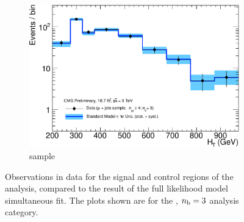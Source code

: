 \begin{figure}[h!]
\begin{subfigure}[b]{0.48\textwidth}
    \includegraphics[width=\textwidth]
    {Figs/results/v0/blueBand/single_plots/muon_3b_ge4j_logy.pdf}
    \caption{\mj sample}
  \end{subfigure}
  \caption{Observations in data for the signal and control
  regions of the analysis, compared to the result of the full likelihood model
  simultaneous fit. The plots shown are for the \njhigh, $n_{\text{b}} = 3$ analysis category.}
  \label{fig:blue_fits_3b_ge4j}
\end{figure}

